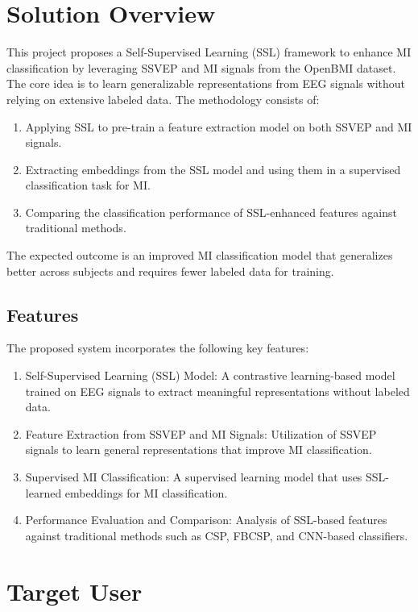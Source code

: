 \section{Solution Overview}
\label{section:solution-overview}

This project proposes a Self-Supervised Learning (SSL) framework to enhance MI classification by leveraging SSVEP and MI signals from the OpenBMI dataset. The core idea is to learn generalizable representations from EEG signals without relying on extensive labeled data. The methodology consists of:
\begin{enumerate}
    \item Applying SSL to pre-train a feature extraction model on both SSVEP and MI signals.
    \item Extracting embeddings from the SSL model and using them in a supervised classification task for MI.
    \item Comparing the classification performance of SSL-enhanced features against traditional methods.
\end{enumerate}
The expected outcome is an improved MI classification model that generalizes better across subjects and requires fewer labeled data for training.

\subsection{Features}
\label{subsection:features}

The proposed system incorporates the following key features:

\begin{enumerate}[leftmargin=80pt]
    \item Self-Supervised Learning (SSL) Model: A contrastive learning-based model trained on EEG signals to extract meaningful representations without labeled data.
    \item Feature Extraction from SSVEP and MI Signals: Utilization of SSVEP signals to learn general representations that improve MI classification.
    \item Supervised MI Classification: A supervised learning model that uses SSL-learned embeddings for MI classification.
    \item Performance Evaluation and Comparison: Analysis of SSL-based features against traditional methods such as CSP, FBCSP, and CNN-based classifiers.
\end{enumerate}

\section{Target User}
\label{section:target-user}

